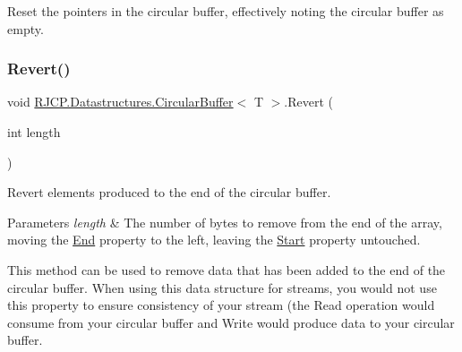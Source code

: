 Reset the pointers in the circular buffer, effectively noting the circular buffer as empty. 

\mbox{\label{class_r_j_c_p_1_1_datastructures_1_1_circular_buffer_a4306bff98e415bb3238bcd180618a680}} 
\subsubsection{\texorpdfstring{Revert()}{Revert()}}
{\footnotesize\ttfamily void \mbox{\hyperlink{class_r_j_c_p_1_1_datastructures_1_1_circular_buffer}{R\+J\+C\+P.\+Datastructures.\+Circular\+Buffer}}$<$ T $>$.Revert (\begin{DoxyParamCaption}\item[{int}]{length }\end{DoxyParamCaption})}



Revert elements produced to the end of the circular buffer. 


\begin{DoxyParams}{Parameters}
{\em length} & The number of bytes to remove from the end of the array, moving the \mbox{\hyperlink{class_r_j_c_p_1_1_datastructures_1_1_circular_buffer_a8e98be8b2cf3d34965db9d7813443169}{End}} property to the left, leaving the \mbox{\hyperlink{class_r_j_c_p_1_1_datastructures_1_1_circular_buffer_ae484f7e6b94997f0079b1d826db7debb}{Start}} property untouched.\\
\hline
\end{DoxyParams}


This method can be used to remove data that has been added to the end of the circular buffer. When using this data structure for streams, you would not use this property to ensure consistency of your stream (the {\ttfamily Read} operation would consume from your circular buffer and {\ttfamily Write} would produce data to your circular buffer. \mbox{\label{class_r_j_c_p_1_1_datastructures_1_1_circular_buffer_aadfb2057db122636b7721fb9262b5bf9}} 
